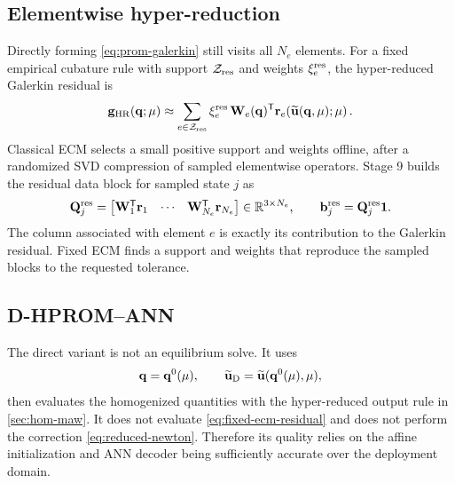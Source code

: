 \documentclass[11pt,a4paper]{article}
\newcommand{\R}{\mathbb{R}}
\newcommand{\transpose}{^{\mathsf T}}
\newcommand{\vect}[1]{\mathbf{#1}}
\newcommand{\mat}[1]{\mathbf{#1}}
\newcommand{\set}[1]{\mathcal{#1}}
\begin{document}
\subsection{Elementwise hyper-reduction}

Directly forming \cref{eq:prom-galerkin} still visits all \(N_e\) elements.
For a fixed empirical cubature rule with support \(\set Z_{\rm res}\) and
weights \(\xi_e^{\rm res}\), the hyper-reduced Galerkin residual is
\begin{equation}
  \vect g_{\rm HR}(\vect q;\vect\mu)
  \approx
  \sum_{e\in\set Z_{\rm res}}
  \xi_e^{\rm res}\,
  \mat W_e(\vect q)\transpose
  \vect r_e\!\left(\widetilde{\vect u}(\vect q,\vect\mu);\vect\mu\right).
  \label{eq:fixed-ecm-residual}
\end{equation}
Classical ECM selects a small positive support and weights offline, after a
randomized SVD compression of sampled elementwise operators.  Stage 9 builds
the residual data block for sampled state \(j\) as
\begin{equation}
  \mat Q_j^{\rm res}
  =\begin{bmatrix}
     \mat W_1\transpose\vect r_1 & \cdots &
     \mat W_{N_e}\transpose\vect r_{N_e}
   \end{bmatrix}
  \in\R^{3\times N_e},
  \qquad
  \vect b_j^{\rm res}=\mat Q_j^{\rm res}\vect1.
  \label{eq:ecm-residual-data}
\end{equation}
The column associated with element \(e\) is exactly its contribution to the
Galerkin residual.  Fixed ECM finds a support and weights that reproduce the
sampled blocks to the requested tolerance.

\subsection{D-HPROM--ANN}

The direct variant is not an equilibrium solve.  It uses
\begin{equation}
  \vect q=\vect q^0(\vect\mu),
  \qquad
  \widetilde{\vect u}_{\rm D}
  =\widetilde{\vect u}(\vect q^0(\vect\mu),\vect\mu),
  \label{eq:direct-state}
\end{equation}
then evaluates the homogenized quantities with the hyper-reduced output rule
in \cref{sec:hom-maw}.  It does not evaluate \cref{eq:fixed-ecm-residual} and
does not perform the correction \cref{eq:reduced-newton}.  Therefore its
quality relies on the affine initialization and ANN decoder being sufficiently
accurate over the deployment domain.
\end{document}
